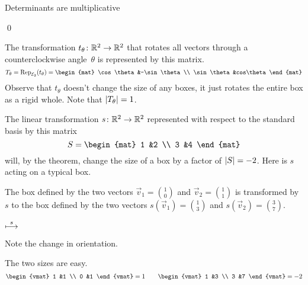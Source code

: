 \documentclass[10pt,t]{beamer}
\begin{document}
\begin{frame}{Determinants are multiplicative}
\th[th:MatChVolByDetMat]  

\pause
\pf
{}

\pause
{}
\end{frame}
\begin{frame}
\qed
\end{frame}
\begin{frame}
\ex
The transformation $\mbox{$t_{\theta}\colon \mathbb{R}^2\to \mathbb{R}^2$}$ 
that rotates all vectors through a counterclockwise
angle~$\theta$ is represented 
by this matrix.
\begin{equation*}
  T_\theta=
  \rep{t_\theta}{\stdbasis_2}
  =
  \begin{mat}
    \cos\theta  &-\sin\theta \\
    \sin\theta  &cos\theta
  \end{mat}
\end{equation*}
Observe that $t_\theta$ doesn't change the size of any boxes, it just rotates 
the entire box as a rigid whole.
Note that $\deter{T_\theta}=1$.

\pause
\ex The linear transformation $\mbox{$s\colon \mathbb{R}^2\to \mathbb{R}^2$}$
represented with respect to the standard basis by this matrix
\begin{equation*}
  S=
  \begin{mat}
    1 &2 \\
    3 &4
  \end{mat}
\end{equation*}
will, by the theorem, change the size of a box by a factor of $\deter{S}=-2$.
Here is $s$ acting on a typical box. 
\end{frame}
\begin{frame} 
The box defined by the two vectors $\vec{v}_1=\binom{1}{0}$ and
$\vec{v}_2=\binom{1}{1}$ is transformed by~$s$ to the box defined by the 
two vectors $s(\vec{v}_1)=\binom{1}{3}$ and 
$s(\vec{v}_2)=\binom{3}{7}$. 
\begin{center}
  \quad$\stackrel{s}{\longmapsto}$\quad
\end{center}
Note the change in orientation.

\pause
The two sizes are easy.
\begin{equation*}
  \begin{vmat}
    1 &1 \\ 
    0 &1  
  \end{vmat}
  =1
  \qquad
  \begin{vmat}
    1 &3 \\ 
    3 &7  
  \end{vmat}
  =-2
\end{equation*}
\end{frame}
\end{document}
